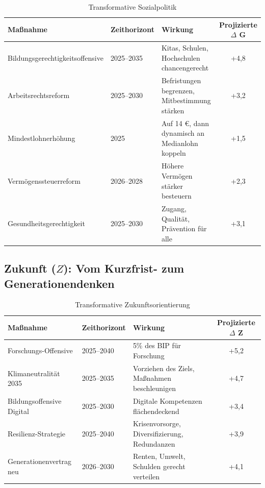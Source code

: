 \begin{table}[ht]
    \centering
    \caption{Transformative Sozialpolitik}
    \label{tab:sozialpolitik_transformativ}
    \begin{tabular}{llp{6cm}c}
        \toprule
        \textbf{Maßnahme} & \textbf{Zeithorizont} & \textbf{Wirkung} & \textbf{Projizierte $\Delta$ G} \\
        \midrule
        Bildungsgerechtigkeitsoffensive & 2025–2035 & Kitas, Schulen, Hochschulen chancengerecht & +4,8 \\
        Arbeitsrechtsreform & 2025–2030 & Befristungen begrenzen, Mitbestimmung stärken & +3,2 \\
        Mindestlohnerhöhung & 2025 & Auf 14 €, dann dynamisch an Medianlohn koppeln & +1,5 \\
        Vermögenssteuerreform & 2026–2028 & Höhere Vermögen stärker besteuern & +2,3 \\
        Gesundheitsgerechtigkeit & 2025–2030 & Zugang, Qualität, Prävention für alle & +3,1 \\
        \bottomrule
    \end{tabular}
\end{table}

\subsection{Zukunft (\(Z\)): Vom Kurzfrist- zum Generationendenken}

\begin{table}[ht]
    \centering
    \caption{Transformative Zukunftsorientierung}
    \label{tab:zukunftspolitik_transformativ}
    \begin{tabular}{llp{6cm}c}
        \toprule
        \textbf{Maßnahme} & \textbf{Zeithorizont} & \textbf{Wirkung} & \textbf{Projizierte $\Delta$ Z} \\
        \midrule
        Forschungs-Offensive & 2025–2040 & 5\% des BIP für Forschung & +5,2 \\
        Klimaneutralität 2035 & 2025–2035 & Vorziehen des Ziels, Maßnahmen beschleunigen & +4,7 \\
        Bildungsoffensive Digital & 2025–2030 & Digitale Kompetenzen flächendeckend & +3,4 \\
        Resilienz-Strategie & 2025–2040 & Krisenvorsorge, Diversifizierung, Redundanzen & +3,9 \\
        Generationenvertrag neu & 2026–2030 & Renten, Umwelt, Schulden gerecht verteilen & +4,1 \\
        \bottomrule
    \end{tabular}
\end{table}

